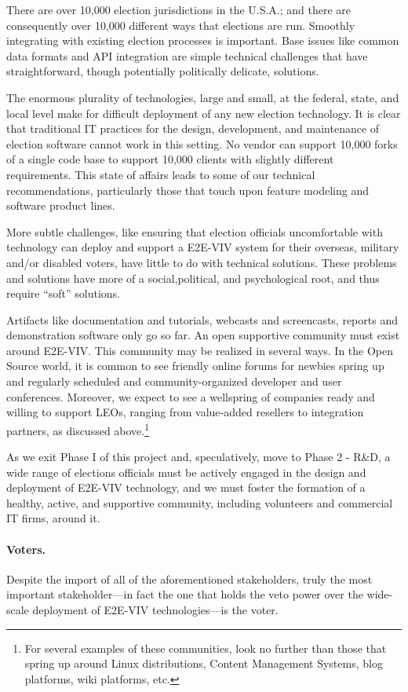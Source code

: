 There are over 10,000 election jurisdictions in the U.S.A.; and there
are consequently over 10,000 different ways that elections are
run. Smoothly integrating with existing election processes is
important. Base issues like common data formats and API integration
are simple technical challenges that have straightforward, though
potentially politically delicate, solutions.

The enormous plurality of technologies, large and small, at the
federal, state, and local level make for difficult deployment of any
new election technology. It is clear that traditional IT practices for
the design, development, and maintenance of election software cannot
work in this setting. No vendor can support 10,000 forks of a single
code base to support 10,000 clients with slightly different
requirements. This state of affairs leads to some of our technical
recommendations, particularly those that touch upon feature modeling
and software product lines.

More subtle challenges, like ensuring that election officials
uncomfortable with technology can deploy and support a E2E-VIV system
for their overseas, military and/or disabled voters, have little to 
do with technical solutions. These problems and solutions have more 
of a social,political, and psychological root, and thus require 
``soft'' solutions.

Artifacts like documentation and tutorials, webcasts and screencasts,
reports and demonstration software only go so far. An open supportive
community must exist around E2E-VIV.  This community may be realized
in several ways.  In the Open Source world, it is common to see
friendly online forums for newbies spring up and regularly scheduled
and community-organized developer and user conferences.  Moreover, we
expect to see a wellspring of companies ready and willing to support
LEOs, ranging from value-added resellers to integration partners, as
discussed above.\footnote{For several examples of these communities,
  look no further than those that spring up around Linux
  distributions, Content Management Systems, blog platforms, wiki
  platforms, etc.}
  
As we exit Phase I of this project and, speculatively, move to Phase
2 - R\&D, a wide range of elections officials must be actively engaged in
the design and deployment of E2E-VIV technology, and we must foster
the formation of a healthy, active, and supportive community,
including volunteers and commercial IT firms, around it.

\paragraph{Voters.} Despite the import of all of the aforementioned
stakeholders, truly the most important stakeholder---in fact the one
that holds the veto power over the wide-scale deployment of E2E-VIV
technologies---is the voter.

